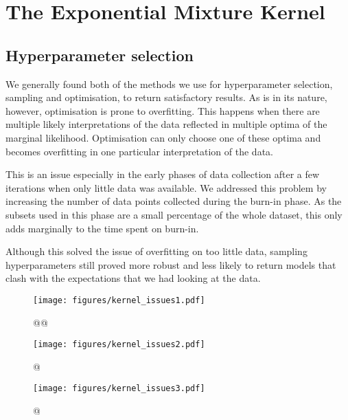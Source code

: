 \documentclass[a4paper,12pt,twoside,openright]{report}
\begin{document}
\section{The Exponential Mixture Kernel}

\subsection{Hyperparameter selection}

We generally found both of the methods we use for hyperparameter selection, sampling and optimisation, to return satisfactory results. As is in its nature, however, optimisation is prone to overfitting. This happens when there are multiple likely interpretations of the data reflected in multiple optima of the marginal likelihood. Optimisation can only choose one of these optima and becomes overfitting in one particular interpretation of the data.

This is an issue especially in the early phases of data collection after a few iterations when only little data was available. We addressed this problem by increasing the number of data points collected during the burn-in phase. As the subsets used in this phase are a small percentage of the whole dataset, this only adds marginally to the time spent on burn-in.

Although this solved the issue of overfitting on too little data, sampling hyperparameters still proved more robust and less likely to return models that clash with the expectations that we had looking at the data.

\begin{figure}
\centering
  \texttt{[image: figures/kernel\_issues1.pdf]}
  \caption{@@}
  \label{kernel_issues1}
\end{figure}

\begin{figure}
\centering
  \texttt{[image: figures/kernel\_issues2.pdf]}
  \caption{@}
  \label{kernel_issues2}
\end{figure}


\begin{figure}
\centering
  \texttt{[image: figures/kernel\_issues3.pdf]}
  \caption{@}
  \label{kernel_issues3}
\end{figure}
\end{document}

